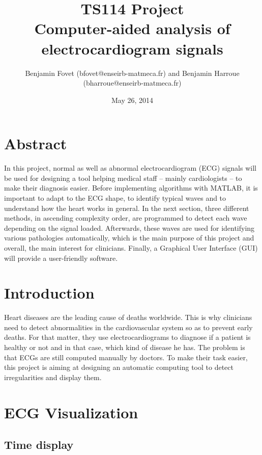 \documentclass[11pt]{article}
\title{\textsf{TS114 Project\\Computer-aided analysis of electrocardiogram signals}}
\author{\textsf{Benjamin Fovet (bfovet@enseirb-matmeca.fr) and Benjamin Harroue (bharroue@enseirb-matmeca.fr)}}
\date{\textsf{May 26, 2014}}
\begin{document}
\pagestyle{plain}
\allowdisplaybreaks

\maketitle

\section{Abstract}

In this project, normal as well as abnormal electrocardiogram (ECG) signals will be used for designing a tool helping medical staff -- mainly cardiologists -- to make their diagnosis easier. Before implementing algorithms with MATLAB, it is important to adapt to the ECG shape, to identify typical waves and to understand how the heart works in general. In the next section, three different methods, in ascending complexity order, are programmed to detect each wave depending on the signal loaded. Afterwards, these waves are used for identifying various pathologies automatically, which is the main purpose of this project and overall, the main interest for clinicians. Finally, a Graphical User Interface (GUI) will provide a user-friendly software.

\tableofcontents

\vspace{8pt}
\noindent
\section{Introduction}

Heart diseases are the leading cause of deaths worldwide. This is why clinicians need to detect abnormalities in the cardiovascular system so as to prevent early deaths. For that matter, they use electrocardiograms to diagnose if a patient is healthy or not and in that case, which kind of disease he has. The problem is that ECGs are still computed manually by doctors. To make their task easier, this project is aiming at designing an automatic computing tool to detect irregularities and display them.

\vspace{8pt}
\section{ECG Visualization}

	\subsection{Time display}
	
\end{document}
